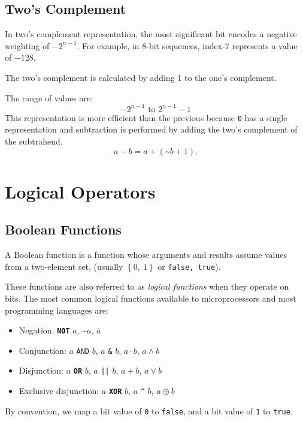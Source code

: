 \documentclass{report}
\newcommand{\keywordinline}[1]{\textcolor[rgb]{0.00,0.50,0.00}{\textbf{\texttt{#1}}}}
\begin{document}
\subsection{Two's Complement}
In two's complement representation, the most significant bit encodes a negative weighting of
\(-2^{n - 1}\). For example, in 8-bit sequences, index-7 represents a value of \(-128\).

The two's complement is calculated by adding 1 to the one's complement.

The range of values are:
\begin{equation*}
    -2^{n - 1} \text{ to } 2^{n - 1} - 1
\end{equation*}
This representation is more efficient than the previous because \texttt{0} has a single representation
and subtraction is performed by adding the two's complement of the subtrahend.
\begin{equation*}
    a - b = a + \left( \text{\textasciitilde} b + 1 \right).
\end{equation*}
\section{Logical Operators}
\subsection{Boolean Functions}
A Boolean function is a function whose arguments and results assume values
from a two-element set, (usually \(\left\{ 0,\: 1 \right\}\) or \texttt{{false, true}}).

These functions are also referred to as \textit{logical functions} when they operate on bits.
The most common logical functions available to microprocessors and most programming languages are:
\begin{itemize}
    \item Negation: \keywordinline{NOT} \(a\), \textasciitilde\(a\), \(\overline{a}\)
    \item Conjunction: \(a\) \texttt{AND} \(b\), \(a\) \texttt{&} \(b\), \(a \cdot b\), \(a \land b\)
    \item Disjunction: \(a\) \keywordinline{OR} \(b\), \(a\) \texttt{|\vert|} \(b\), \(a + b\), \(a \lor b\)
    \item Exclusive disjunction: \(a\) \keywordinline{XOR} \(b\), \(a\) \texttt{^} \(b\), \(a \oplus b\)
\end{itemize}
By convention, we map a bit value of \texttt{0} to \texttt{false}, and a bit value of \texttt{1} to \texttt{true}.
\end{document}
